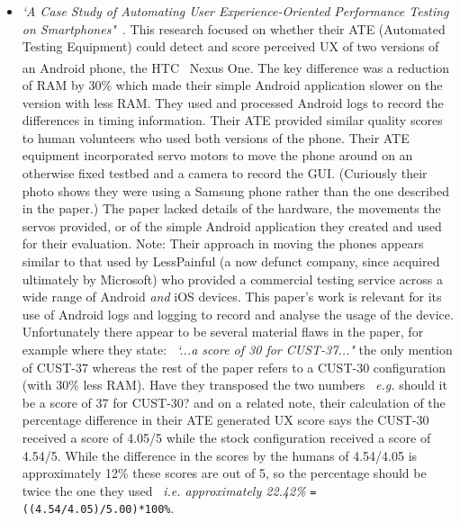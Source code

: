 \begin{itemize}
    \item \emph{`A Case Study of Automating User Experience-Oriented Performance Testing on Smartphones"}~\citep{canfora2013_automating_UX_experience_testing_on_smartphones}. %
    This research focused on whether their ATE (Automated Testing Equipment) could detect and score perceived UX of two versions of an Android phone, the HTC~\textsuperscript{\textregistered} Nexus One. The key difference was a reduction of RAM by 30\% which made their simple Android application slower on the version with less RAM. They used and processed Android logs to record the differences in timing information. Their ATE provided similar quality scores to human volunteers who used both versions of the phone. Their ATE equipment incorporated servo motors to move the phone around on an otherwise fixed testbed and a camera to record the GUI. (Curiously their photo shows they were using a Samsung phone rather than the one described in the paper.) The paper lacked details of the hardware, the movements the servos provided, or of the simple Android application they created and used for their evaluation.
    Note: Their approach in moving the phones appears similar to that used by LessPainful (a now defunct company, since acquired ultimately by Microsoft) who provided a commercial testing service across a wide range of Android \textit{and} iOS devices. 
    This paper's work is relevant for its use of Android logs and logging to record and analyse the usage of the device. Unfortunately there appear to be several material flaws in the paper, for example where they state: ~\emph{`...a score of 30 for CUST-37..."} the only mention of CUST-37 whereas the rest of the paper refers to a CUST-30 configuration (with 30\% less RAM). Have they transposed the two numbers ~\emph{e.g.} should it be a score of 37 for CUST-30? and on a related note, their calculation of the percentage difference in their ATE generated UX score says the CUST-30 received a score of 4.05/5 while the stock configuration received a score of 4.54/5. While the difference in the scores by the humans of 4.54/4.05 is approximately 12\% these scores are out of 5, so the percentage should be twice the one they used ~\emph{i.e. approximately 22.42\%}  \texttt{=((4.54/4.05)/5.00)*100\%}.
    

\end{itemize}
